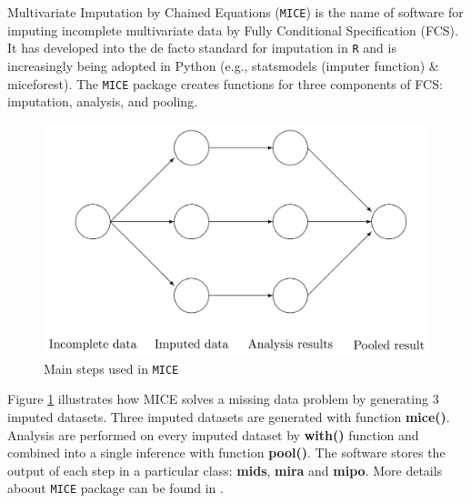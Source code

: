	Multivariate Imputation by Chained Equations (\texttt{MICE}) is the name of software for imputing incomplete multivariate data by Fully Conditional Specification (FCS). It has developed into the de facto standard for imputation in \texttt{R} and is increasingly being adopted in Python (e.g., statsmodels (imputer function) \& miceforest). The \texttt{MICE} package creates functions for three components of FCS: imputation, analysis, and pooling. 
	\begin{figure}[ht!]
		\centering
		\includegraphics[scale=.2]{plots/miflow}
		\caption{Main steps used in \texttt{MICE} \citep{Buuren2011}}
		\label{fig6_1}
	\end{figure} 
	Figure \ref{fig6_1} illustrates how MICE solves a missing data problem by generating 3 imputed datasets. Three imputed datasets are generated with function \textbf{mice()}. Analysis are performed on every imputed dataset by \textbf{with()} function and combined into a single inference with function \textbf{pool()}. The software stores the output of each step in a particular class: \textbf{mids}, \textbf{mira} and \textbf{mipo}. More details aboout \texttt{MICE} package can be found in \citet{Buuren2011}.
	
